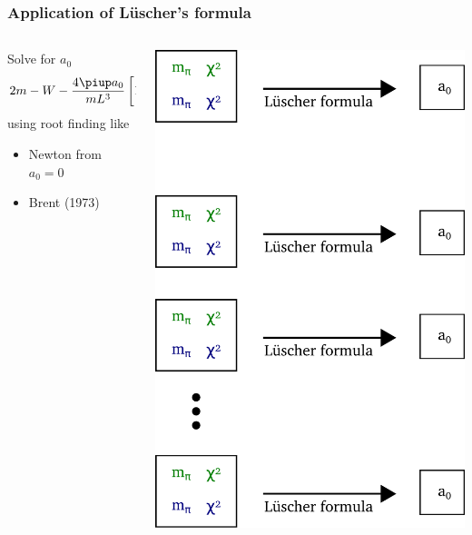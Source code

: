 \documentclass[english, fleqn]{beamer}
\begin{document}
\begin{frame}
    \frametitle{Application of Lüscher's formula}
    \begin{columns}
        \begin{column}{0.6\textwidth}
                
            Solve for $a_0$
            \[
                2m - W - \frac{4 \piup a_0}{m L^3} \sbr{1 + c_1 \frac{a_0}L + c_2 \frac{a_0^2}{L^2}} = 0
            \]
            using root finding like
            \begin{itemize}
                \item
                    Newton from $a_0 = 0$
                \item
                    Brent (1973)
            \end{itemize}

        \end{column}
        \begin{column}{0.4\textwidth}
            \begin{center}
                \includegraphics[scale=\scale]{sketches/07-luescher.pdf}
            \end{center}
        \end{column}
    \end{columns}
\end{frame}
\end{document}
